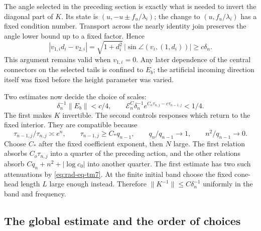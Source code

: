 The angle selected in the preceding section is exactly what is needed
to invert the diagonal part of $K$.  Its state is
$(u,-u\pm f_u/\lambda_i)$; the change to $(u,f_u/\lambda_i)$
has a fixed condition number.  Transport across the nearly identity
join preserves the angle lower bound up to a fixed factor.  Hence
\begin{equation}\label{eq:rad-eq-tm9}
 |v_{1,i}d_i-v_{2,i}|
 =\sqrt{1+d_i^2}\,|\sin\angle(v_i,(1,d_i))|
 \ge c\delta_n.
\end{equation}
This argument remains valid when $v_{1,i}=0$.
Any later dependence of the central connectors on the selected tails
is confined to $E_b$; the artificial incoming direction itself was
fixed before the height parameter was varied.

Two estimates now decide the choice of scales:
\begin{equation}\label{eq:rad-eq-tm10}
 \delta_n^{-1}\|E_b\|<c/4,\qquad
 \mathcal E_n^C\delta_n^{-1}
     e^{C_o\tau_{n,j}-c\tau_{n-1,j}}<1/4.
\end{equation}
The first makes $K$ invertible.  The second controls responses which
return to the fixed interior.  They are compatible because
\[
 \tau_{n-1,j}/\tau_{n,j}\asymp e^n,\qquad
 \tau_{n-1,j}\ge C_*q_{n-1},\qquad
 q_n/q_{n-1}\to1,\qquad n^2/q_{n-1}\to0.
\]
Choose $C_*$ after the fixed coefficient exponent, then $N$ large.
The first relation absorbs $C_o\tau_{n,j}$ into a quarter of the
preceding action, and the other relations absorb $Cq_n+n^2+|\log c_0|$
into another quarter.  The first estimate has two such attenuations
by \eqref{eq:rad-eq-tm7}.  At the finite initial band choose the fixed
cone-head length $L$ large enough instead.  Therefore
$\|K^{-1}\|\le C\delta_n^{-1}$ uniformly in the band and frequency.

\subsection{The global estimate and the order of choices}

